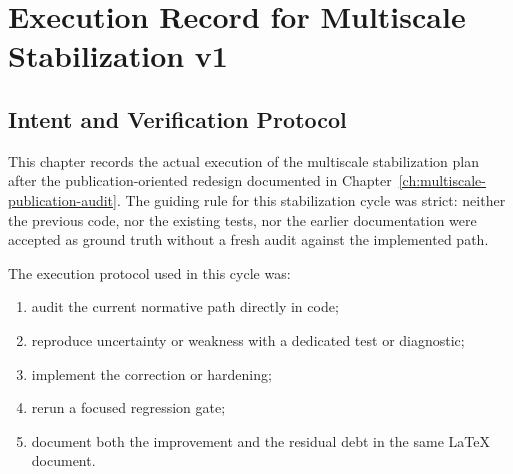 
\chapter{Execution Record for Multiscale Stabilization v1}
\label{ch:multiscale-stabilization-execution}

\section{Intent and Verification Protocol}
\label{sec:ms-stab-protocol}

This chapter records the actual execution of the multiscale stabilization plan
after the publication-oriented redesign documented in
Chapter~\ref{ch:multiscale-publication-audit}.  The guiding rule for this
stabilization cycle was strict: neither the previous code, nor the existing
tests, nor the earlier documentation were accepted as ground truth without a
fresh audit against the implemented path.

The execution protocol used in this cycle was:
\begin{enumerate}
  \item audit the current normative path directly in code;
  \item reproduce uncertainty or weakness with a dedicated test or diagnostic;
  \item implement the correction or hardening;
  \item rerun a focused regression gate;
  \item document both the improvement and the residual debt in the same
    \LaTeX{} document.
\end{enumerate}

